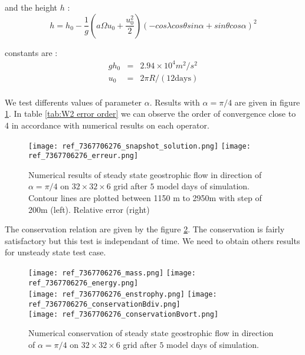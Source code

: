 and the height $h$ :
\begin{equation}
h=h_0- \dfrac{1}{g} \left( a \Omega u_0 + \dfrac{u_0^2}{2} \right) \left( -cos \lambda cos \theta sin \alpha + sin \theta cos \alpha \right)^2 
\label{eq:W2 height}
\end{equation}

constants are :
\begin{equation}
\begin{array}{rcl}
gh_0 & = & 2.94 \times 10^4 m^2/s^2\\
u_0 & = & 2 \pi R / (12 \text{days}) \\
\end{array}
\end{equation}

We test differents values of parameter $\alpha$. Results with $\alpha=\pi/4$ are given in figure \ref{fig:W2 alpha=pi/4}. In table \ref{tab:W2 error order} we can observe the order of convergence close to 4 in accordance with numerical results on each operator.

\begin{figure}[ht!]
\texttt{[image: ref\_7367706276\_snapshot\_solution.png]}
\texttt{[image: ref\_7367706276\_erreur.png]}
\caption{Numerical results of steady state geostrophic flow in direction of $\alpha=\pi/4$ on  $32 \times 32 \times 6$ grid after $5$ model days of simulation. Contour lines are plotted between 1150 m to 2950m with step of 200m (left). Relative error (right) }
\label{fig:W2 alpha=pi/4}
\end{figure}

The conservation relation are given by the figure \ref{fig:W2 conservation alpha=pi/4}. The conservation is fairly satisfactory but this test is independant of time. We need to obtain others results for unsteady state test case. 

\begin{figure}[ht!]
\texttt{[image: ref\_7367706276\_mass.png]}
\texttt{[image: ref\_7367706276\_energy.png]}\\
\texttt{[image: ref\_7367706276\_enstrophy.png]}
\texttt{[image: ref\_7367706276\_conservationBdiv.png]}\\
\texttt{[image: ref\_7367706276\_conservationBvort.png]}
\caption{Numerical conservation of steady state geostrophic flow in direction of $\alpha=\pi/4$ on  $32 \times 32 \times 6$ grid after $5$ model days of simulation.}
\label{fig:W2 conservation alpha=pi/4}
\end{figure}

